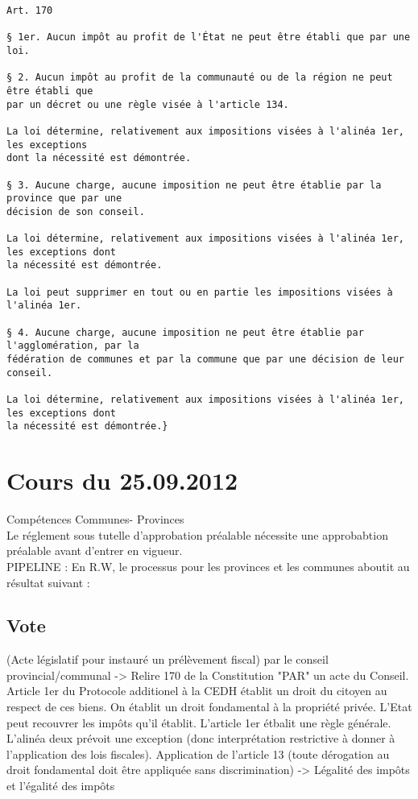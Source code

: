\documentclass{book}
\begin{document}
\begin{verbatim}
Art. 170

§ 1er. Aucun impôt au profit de l'État ne peut être établi que par une loi.

§ 2. Aucun impôt au profit de la communauté ou de la région ne peut être établi que 
par un décret ou une règle visée à l'article 134.

La loi détermine, relativement aux impositions visées à l'alinéa 1er, les exceptions 
dont la nécessité est démontrée.

§ 3. Aucune charge, aucune imposition ne peut être établie par la province que par une
décision de son conseil.

La loi détermine, relativement aux impositions visées à l'alinéa 1er, les exceptions dont
la nécessité est démontrée.

La loi peut supprimer en tout ou en partie les impositions visées à l'alinéa 1er.

§ 4. Aucune charge, aucune imposition ne peut être établie par l'agglomération, par la 
fédération de communes et par la commune que par une décision de leur conseil.

La loi détermine, relativement aux impositions visées à l'alinéa 1er, les exceptions dont 
la nécessité est démontrée.}

\end{verbatim}

\chapter{Cours du 25.09.2012}

Compétences Communes- Provinces\\

Le réglement sous tutelle d'approbation préalable nécessite une approbabtion préalable avant d'entrer en vigueur.\\

PIPELINE : En R.W, le processus pour les provinces et les communes aboutit au résultat suivant :


\section{Vote} 

(Acte législatif pour instauré un prélèvement fiscal) par le conseil provincial/communal -> Relire 170 de la Constitution "PAR" un acte du Conseil.\\

Article 1er du Protocole additionel à la CEDH établit un droit du citoyen au respect de ces biens. On établit un droit fondamental à la propriété privée. L'Etat peut recouvrer les impôts qu'il établit. L'article 1er étbalit une règle générale. L'alinéa deux prévoit une exception (donc interprétation restrictive à donner à l'application des lois fiscales). Application de l'article 13 (toute dérogation au droit fondamental doit être appliquée sans discrimination) -> Légalité des impôts et l'égalité des impôts\\
\end{document}
